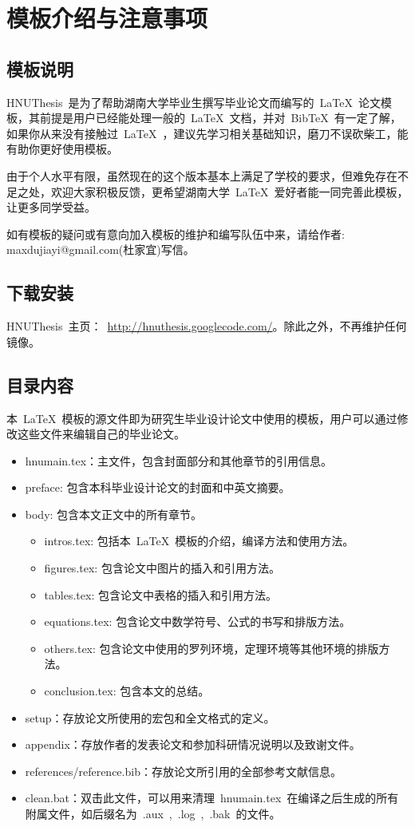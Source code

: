 
\chapter{模板介绍与注意事项}
\section{模板说明}

HNUThesis~是为了帮助湖南大学毕业生撰写毕业论文而编写的~\LaTeX~论文模板，其前提是用户已经能处理一般的~\LaTeX~文档，并对~BibTeX~有一定了解，如果你从来没有接触过~\LaTeX~，建议先学习相关基础知识，磨刀不误砍柴工，能有助你更好使用模板。

由于个人水平有限，虽然现在的这个版本基本上满足了学校的要求，但难免存在不足之处，欢迎大家积极反馈，更希望湖南大学~\LaTeX~爱好者能一同完善此模板，让更多同学受益。

如有模板的疑问或有意向加入模板的维护和编写队伍中来，请给作者: maxdujiayi@gmail.com(杜家宜)写信。~\cite{byf2008}~\cite{ahern1995greenways}

\section{下载安装}
HNUThesis~主页：~\url{http://hnuthesis.googlecode.com/}。除此之外，不再维护任何镜像。

\section{目录内容}
本~\LaTeX{}~模板的源文件即为研究生毕业设计论文中使用的模板，用户可以通过修改这些文件来编辑自己的毕业论文。
\begin{itemize}
\item{hnumain.tex}：主文件，包含封面部分和其他章节的引用信息。
\item{preface}: 包含本科毕业设计论文的封面和中英文摘要。
\item{body}: 包含本文正文中的所有章节。
\begin{itemize}
\item{intros.tex}: 包括本~\LaTeX{}~模板的介绍，编译方法和使用方法。
\item{figures.tex}: 包含论文中图片的插入和引用方法。
\item{tables.tex}: 包含论文中表格的插入和引用方法。
\item{equations.tex}: 包含论文中数学符号、公式的书写和排版方法。
\item{others.tex}: 包含论文中使用的罗列环境，定理环境等其他环境的排版方法。
\item{conclusion.tex}: 包含本文的总结。
\end{itemize}
\item{setup}：存放论文所使用的宏包和全文格式的定义。
\item{appendix}：存放作者的发表论文和参加科研情况说明以及致谢文件。
\item{references/reference.bib}：存放论文所引用的全部参考文献信息。
\item{clean.bat}：双击此文件，可以用来清理~hnumain.tex~在编译之后生成的所有附属文件，如后缀名为~.aux~,~.log~,~.bak~的文件。
\end{itemize}


